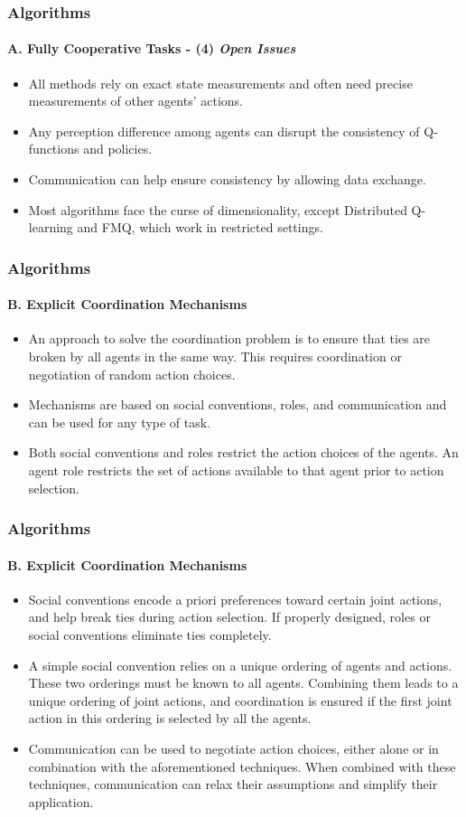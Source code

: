 \documentclass{beamer}
\begin{document}
\begin{frame}
\frametitle{Algorithms}
\framesubtitle{A. Fully Cooperative Tasks - (4) \textit{Open Issues}}
\begin{itemize}
\item All methods rely on exact state measurements and often need precise measurements of other agents' actions.
\item Any perception difference among agents can disrupt the consistency of Q-functions and policies.
\item Communication can help ensure consistency by allowing data exchange.
\item Most algorithms face the curse of dimensionality, except Distributed Q-learning and FMQ, which work in restricted settings.
\end{itemize}

\end{frame}

\begin{frame}
\frametitle{Algorithms}
\framesubtitle{B. Explicit Coordination Mechanisms}
\begin{itemize}
\item An approach to solve the coordination problem is to ensure that ties are broken by all agents in the same way. This requires coordination or negotiation of random action choices.
\item Mechanisms are based on social conventions, roles, and communication and can be used for any type of task.
\item Both social conventions and roles restrict the action choices of the agents. An agent role restricts the set of actions available to that agent prior to action selection.

\end{itemize}

\end{frame}

\begin{frame}
\frametitle{Algorithms}
\framesubtitle{B. Explicit Coordination Mechanisms}
\begin{itemize}
\item Social conventions encode a priori preferences toward certain joint actions, and help break ties during action selection. If properly designed, roles or social conventions eliminate ties completely.
\item A simple social convention relies on a unique ordering of agents and actions. These two orderings must be known to all agents. Combining them leads to a unique ordering of joint actions, and coordination is ensured if the first joint action in this ordering is selected by all the agents.
\item Communication can be used to negotiate action choices, either alone or in combination with the aforementioned techniques. When combined with these techniques, communication can relax their assumptions and simplify their application.
\end{itemize}
\end{frame}
\end{document}
